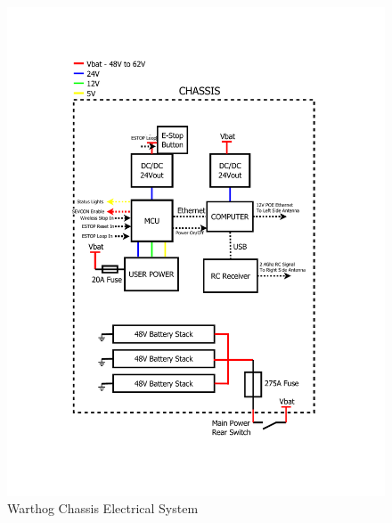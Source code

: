 \documentclass[]{clearpath-latex/clearpath-manual}
\begin{document}
\begin{figure}[!htb]
  \centering
  \includegraphics[width=0.9\linewidth]{elec-chassis.pdf}
  \caption{Warthog Chassis Electrical System}
  \label{elec-chassis}
\end{figure}
\end{document}
